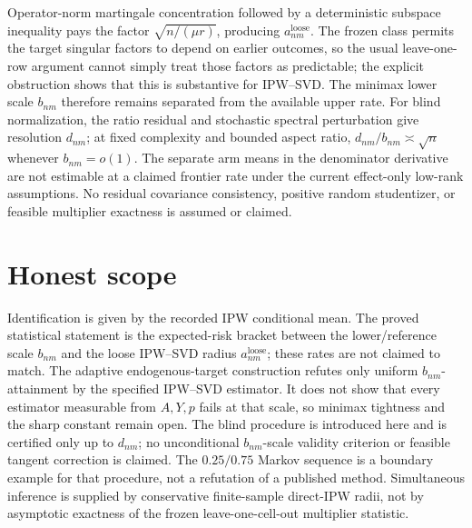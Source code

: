 \documentclass{article}
\begin{document}
Operator-norm martingale concentration followed by a deterministic subspace inequality pays the factor \(\sqrt{n/(\mu r)}\), producing \(a^{\mathrm{loose}}_{nm}\).  The frozen class permits the target singular factors to depend on earlier outcomes, so the usual leave-one-row argument cannot simply treat those factors as predictable; the explicit obstruction shows that this is substantive for IPW--SVD.  The minimax lower scale \(b_{nm}\) therefore remains separated from the available upper rate.  For blind normalization, the ratio residual and stochastic spectral perturbation give resolution \(d_{nm}\); at fixed complexity and bounded aspect ratio, \(d_{nm}/b_{nm}\asymp\sqrt n\) whenever \(b_{nm}=o(1)\).  The separate arm means in the denominator derivative are not estimable at a claimed frontier rate under the current effect-only low-rank assumptions.  No residual covariance consistency, positive random studentizer, or feasible multiplier exactness is assumed or claimed.

\section{Honest scope}

Identification is given by the recorded IPW conditional mean.  The proved statistical statement is the expected-risk bracket between the lower/reference scale \(b_{nm}\) and the loose IPW--SVD radius \(a^{\mathrm{loose}}_{nm}\); these rates are not claimed to match.  The adaptive endogenous-target construction refutes only uniform \(b_{nm}\)-attainment by the specified IPW--SVD estimator.  It does not show that every estimator measurable from \(A,Y,p\) fails at that scale, so minimax tightness and the sharp constant remain open.  The blind procedure is introduced here and is certified only up to \(d_{nm}\); no unconditional \(b_{nm}\)-scale validity criterion or feasible tangent correction is claimed.  The \(0.25/0.75\) Markov sequence is a boundary example for that procedure, not a refutation of a published method.  Simultaneous inference is supplied by conservative finite-sample direct-IPW radii, not by asymptotic exactness of the frozen leave-one-cell-out multiplier statistic.
\end{document}
